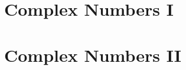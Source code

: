 \documentclass{beamer}
\begin{document}
\part{Complex Numbers I}



\part{Complex Numbers II}







\newcommand{\arrayTwo}[4]{
  \left[
  \begin{array}{rr}
    #1 & #2 \\
    #3 & #4
  \end{array}
  \right]
}

\newcommand{\vecTwo}[2]{
  \left[
  \begin{array}{r}
    #1 \\  #2
  \end{array}
  \right]
}


\newcommand{\stateTwo}[2]{
  \begin{array}{rr}
    \mbox{\fontsize{6}{6}\selectfont $#1$} \\  \mbox{\fontsize{6}{6}\selectfont $#2$}
  \end{array}
}


\newcommand{\arrayThree}[9]{
  \left[
    \begin{array}{rrr}
      #1 & #2 & #3 \\
      #4 & #5 & #6 \\
      #7 & #8 & #9
    \end{array}
  \right]
}

\newcommand{\startRowOps}{
  \left[
    \begin{array}{rrr|r}
}

\newcommand{\oneRowOps}[4] {
      #1 & #2 & #3 & #4 \\
}

\newcommand{\stopRowOps}{
    \end{array}
  \right]
}


\newcommand{\vecThree}[3]{
  \left[
  \begin{array}{r}
    #1 \\  #2 \\ #3
  \end{array}
  \right]
}
\end{document}
